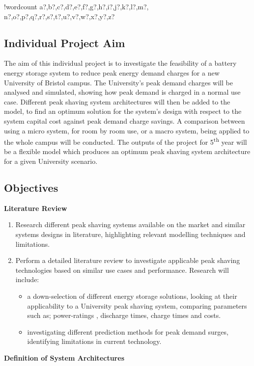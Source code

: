 \documentclass[10pt]{article}
\newcounter{words}
\newenvironment{counted}{%
  \setcounter{words}{0}
  \SearchList!{wordcount}{\stepcounter{words}}
    {a?,b?,c?,d?,e?,f?,g?,h?,i?,j?,k?,l?,m?,
    n?,o?,p?,q?,r?,s?,t?,u?,v?,w?,x?,y?,z?}
  \UndoBoundary{'}
  \SearchOrder{p;}}{%
  \StopSearching}
\begin{document}
\begin{counted}
\subsection{Individual Project Aim}\label{individual-project-aim}

The aim of this individual project is to investigate the feasibility of
a battery energy storage system to reduce peak energy demand charges for
a new University of Bristol campus. The University's peak demand charges
will be analysed and simulated, showing how peak demand is charged in a
normal use case. Different peak shaving system architectures will then
be added to the model, to find an optimum solution for the system's
design with respect to the system capital cost against peak demand
charge savings. A comparison between using a micro system, for room by
room use, or a macro system, being applied to the whole campus will be
conducted. The outputs of the project for 5\textsuperscript{th} year
will be a flexible model which produces an optimum peak shaving system
architecture for a given University scenario.

\subsection{Objectives}\label{objectives}

\textbf{Literature Review}

\begin{enumerate}
\item Research different peak shaving systems available on the market and similar systems designs in literature, highlighting relevant modelling techniques and limitations.
\item Perform a detailed literature review to investigate applicable peak shaving technologies based on similar use cases and performance. Research will include:
    \begin{itemize}
 \item a down-selection of different energy storage solutions, looking at their applicability to a University peak shaving system, comparing parameters such as; power-ratings , discharge times, charge times and costs.
\item investigating different prediction methods for peak demand surges, identifying limitations in current technology.
    \end{itemize}
\end{enumerate}

\textbf{Definition of System Architectures}


\end{counted}
\end{document}
